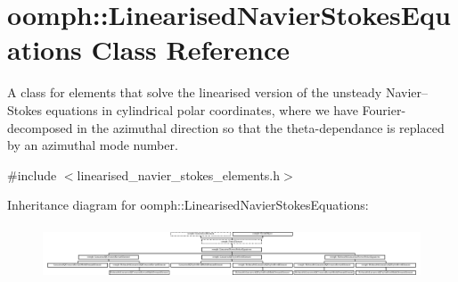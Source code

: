 \hypertarget{classoomph_1_1LinearisedNavierStokesEquations}{}\section{oomph\+:\+:Linearised\+Navier\+Stokes\+Equations Class Reference}
\label{classoomph_1_1LinearisedNavierStokesEquations}


A class for elements that solve the linearised version of the unsteady Navier--Stokes equations in cylindrical polar coordinates, where we have Fourier-\/decomposed in the azimuthal direction so that the theta-\/dependance is replaced by an azimuthal mode number.  




{\ttfamily \#include $<$linearised\+\_\+navier\+\_\+stokes\+\_\+elements.\+h$>$}

Inheritance diagram for oomph\+:\+:Linearised\+Navier\+Stokes\+Equations\+:\begin{figure}[H]
\begin{center}
\leavevmode
\includegraphics[height=1.590909cm]{classoomph_1_1LinearisedNavierStokesEquations}
\end{center}
\end{figure}
